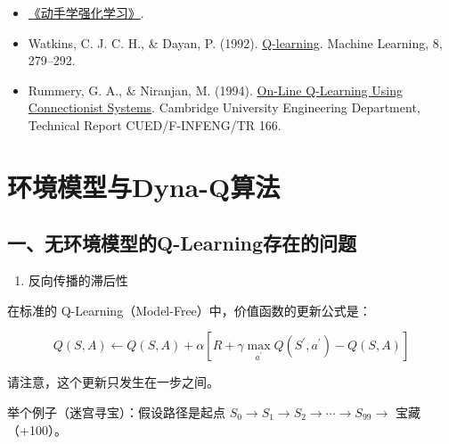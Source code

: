 \vspace{0.25em}
\begin{itemize}
\tightlist
\item
  \href{https://hrl.boyuai.com/}{《动手学强化学习》}.
\item
  Watkins, C. J. C. H., \& Dayan, P. (1992). \href{https://doi.org/10.1007/BF00992698}{Q-learning}. Machine Learning, 8, 279--292.
\item
  Rummery, G. A., \& Niranjan, M. (1994). \href{https://www.cs.utexas.edu/~shivaram/readings/b2hd-RummeryNiranjan1994.html}{On-Line Q-Learning Using Connectionist Systems}. Cambridge University Engineering Department, Technical Report CUED/F-INFENG/TR 166.
\end{itemize}

\clearpage

\hypertarget{ux73afux5883ux6a21ux578bux4e0edyna-qux7b97ux6cd5}{%
\section{环境模型与Dyna-Q算法}\label{ux73afux5883ux6a21ux578bux4e0edyna-qux7b97ux6cd5}}

\hypertarget{ux4e00ux65e0ux73afux5883ux6a21ux578bux7684q-learningux5b58ux5728ux7684ux95eeux9898}{%
\subsection{一、无环境模型的Q-Learning存在的问题}\label{ux4e00ux65e0ux73afux5883ux6a21ux578bux7684q-learningux5b58ux5728ux7684ux95eeux9898}}

\begin{enumerate}
\def\labelenumi{\arabic{enumi}.}
\tightlist
\item
  反向传播的滞后性
\end{enumerate}

在标准的 Q-Learning（Model-Free）中，价值函数的更新公式是：

\[
Q(S,A)\leftarrow Q(S,A)+\alpha[R+\gamma\max_{a^{\prime}}Q(S^{\prime},a^{\prime})-Q(S,A)]
\]

请注意，这个更新只发生在一步之间。

举个例子（迷宫寻宝）：假设路径是起点 \(S_0\to S_1\to S_2\to\cdots\to S_{99}\to\) 宝藏（+100）。

